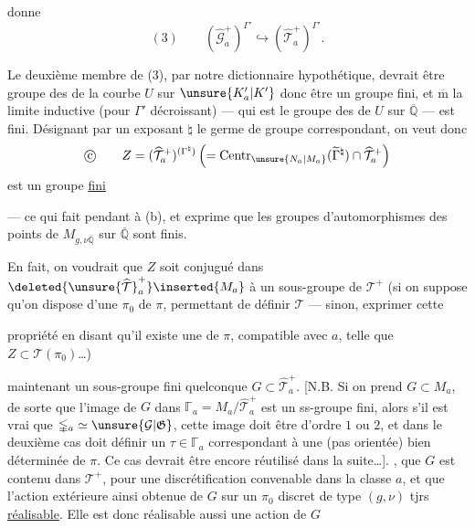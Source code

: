 
donne
\[
(3)\qquad (\widehat{\mathcal G}_a^+)^{\Gamma'}
\hookrightarrow (\widehat{\mathcal T}_a^+)^{\Gamma'}.
\]

Le deuxième membre de (3), par notre dictionnaire hypothétique, devrait être   groupe des  de la courbe $U$ sur $\unsure{K'_a|K'}$ donc être un groupe fini, et $\overline{\mathrm m}$  la limite inductive (pour $\Gamma'$ décroissant) --- qui est le groupe des  de $U$ sur $\overline{\mathbb Q}$ --- est fini. Désignant par un exposant $\natural$ le germe de groupe correspondant, on veut donc
\[
\text{\textcircled{c}}\qquad
Z=(\widehat{\mathcal T}_a^+)^{(\Gamma^{\natural})}
\left(=\operatorname{Centr}_{\unsure{N_a|M_a}}
(\widetilde{\Gamma}^{\natural})\cap\widehat{\mathcal T}_a^+\right)
\]
est un groupe \uline{fini}

--- ce qui fait pendant à (b), et exprime que les groupes d'automorphismes des points de $M_{g,\nu\overline{\mathbb Q}}$ sur $\overline{\mathbb Q}$ sont finis.

En fait, on voudrait que $Z$ soit conjugué dans $\deleted{\unsure{\widehat{\mathcal T}}_a^+}\inserted{M_a}$ à un sous-groupe de  $\mathcal T^+$  (si on suppose qu'on dispose d'une   $\pi_0$ de $\pi$, permettant de définir $\mathcal T$ --- sinon,  exprimer cette


propriété en disant qu'il existe une   de $\pi$, compatible avec $a$, telle que $Z\subset\mathcal T(\pi_0)$\ldots)

 maintenant un sous-groupe fini quelconque $G\subset\widehat{\mathcal T}_a^+$. [N.B. Si on prend  $G\subset M_a$, de sorte que l'image de $G$ dans $\mathbb{\Gamma}_a=M_a/\widehat{\mathcal T}_a^+$ est un ss-groupe fini, alors s'il  est vrai que $\mathbb{\Gamma}_a\simeq\unsure{\mathcal G|\mathfrak G}$,  cette image doit être d'ordre $1$ ou $2$, et dans le deuxième cas doit  définir un $\tau\in\mathbb{\Gamma}_a$ correspondant à une \uline{} (pas orientée) bien déterminée de $\pi$. Ce cas devrait être encore réutilisé dans la suite\ldots].   , que $G$ est contenu dans $\mathcal T^+$,  pour une discrétification convenable dans la classe $a$, et que l'action extérieure ainsi obtenue de $G$ sur un $\pi_0$ discret de type $(g,\nu)$  tjrs \uline{réalisable}. Elle est donc réalisable aussi  une action de $G$

